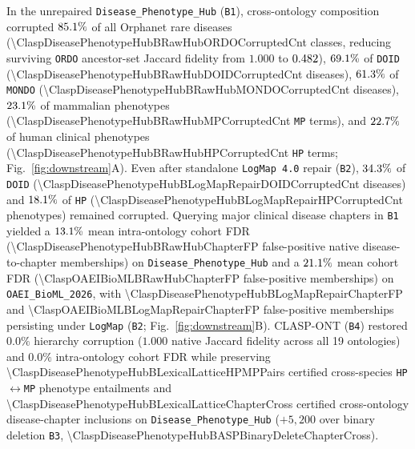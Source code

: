 \documentclass[10pt]{article}
\theoremstyle{accentdef}
\begin{document}
In the unrepaired \texttt{Disease\_Phenotype\_Hub} (\texttt{B1}), cross-ontology composition corrupted $85.1{}\%$ of all Orphanet rare diseases (\num{\ClaspDiseasePhenotypeHubBRawHubORDOCorruptedCnt} classes, reducing surviving \texttt{ORDO} ancestor-set Jaccard fidelity from $1.000$ to $0.482{}$), $69.1{}\%$ of \texttt{DOID} (\num{\ClaspDiseasePhenotypeHubBRawHubDOIDCorruptedCnt} diseases), $61.3{}\%$ of \texttt{MONDO} (\num{\ClaspDiseasePhenotypeHubBRawHubMONDOCorruptedCnt} diseases), $23.1{}\%$ of mammalian phenotypes (\num{\ClaspDiseasePhenotypeHubBRawHubMPCorruptedCnt} \texttt{MP} terms), and $22.7{}\%$ of human clinical phenotypes (\num{\ClaspDiseasePhenotypeHubBRawHubHPCorruptedCnt} \texttt{HP} terms; Fig.~\ref{fig:downstream}A). Even after standalone \texttt{LogMap~4.0} repair (\texttt{B2}), $34.3{}\%$ of \texttt{DOID} (\num{\ClaspDiseasePhenotypeHubBLogMapRepairDOIDCorruptedCnt} diseases) and $18.1{}\%$ of \texttt{HP} (\num{\ClaspDiseasePhenotypeHubBLogMapRepairHPCorruptedCnt} phenotypes) remained corrupted. Querying major clinical disease chapters in \texttt{B1} yielded a $13.1{}\%$ mean intra-ontology cohort FDR (\num{\ClaspDiseasePhenotypeHubBRawHubChapterFP} false-positive native disease-to-chapter memberships) on \texttt{Disease\_Phenotype\_Hub} and a $21.1{}\%$ mean cohort FDR (\num{\ClaspOAEIBioMLBRawHubChapterFP} false-positive memberships) on \texttt{OAEI\_BioML\_2026}, with \num{\ClaspDiseasePhenotypeHubBLogMapRepairChapterFP} and \num{\ClaspOAEIBioMLBLogMapRepairChapterFP} false-positive memberships persisting under \texttt{LogMap} (\texttt{B2}; Fig.~\ref{fig:downstream}B). \textsc{CLASP-ONT} (\texttt{B4}) restored $0.0\%$ hierarchy corruption ($1.000$ native Jaccard fidelity across all 19 ontologies) and $0.0\%$ intra-ontology cohort FDR while preserving \num{\ClaspDiseasePhenotypeHubBLexicalLatticeHPMPPairs} certified cross-species \texttt{HP}$\leftrightarrow$\texttt{MP} phenotype entailments and \num{\ClaspDiseasePhenotypeHubBLexicalLatticeChapterCross} certified cross-ontology disease-chapter inclusions on \texttt{Disease\_Phenotype\_Hub} ($+5{,}200$ over binary deletion \texttt{B3}, \num{\ClaspDiseasePhenotypeHubBASPBinaryDeleteChapterCross}).
\end{document}

